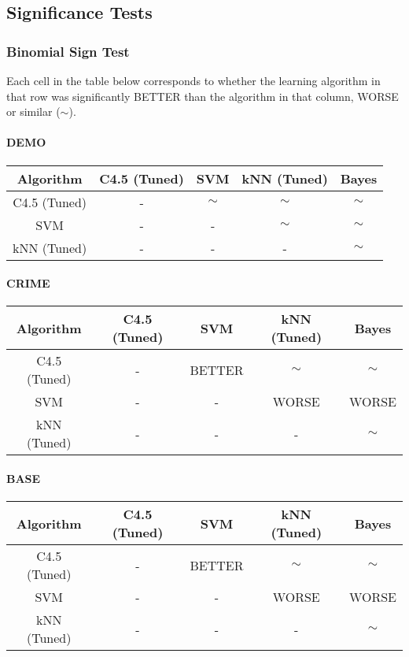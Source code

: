 \documentclass[]{article}
\begin{document}
\subsection{Significance Tests}

\subsubsection{Binomial Sign Test}
Each cell in the table below corresponds to whether the learning algorithm in that row was significantly BETTER than the algorithm in that column, WORSE or similar ($\sim$).

\paragraph{DEMO} \quad

\begin{tabular}{|c|c|c|c|c|}
\hline
Algorithm & C4.5 (Tuned) & SVM & kNN (Tuned) & Bayes \\
\hline
C4.5 (Tuned) & - & $\sim$ & $\sim$ & $\sim$ \\
SVM & - & - & $\sim$ & $\sim$ \\
kNN (Tuned) & - & - & - & $\sim$ \\
\hline
\end{tabular}

\paragraph{CRIME} \quad

\begin{tabular}{|c|c|c|c|c|}
\hline
Algorithm & C4.5 (Tuned) & SVM & kNN (Tuned) & Bayes \\
\hline
C4.5 (Tuned) & - & BETTER & $\sim$ & $\sim$ \\
SVM & - & - & WORSE & WORSE \\
kNN (Tuned) & - & - & - & $\sim$ \\
\hline
\end{tabular}

\paragraph{BASE} \quad

\begin{tabular}{|c|c|c|c|c|}
\hline
Algorithm & C4.5 (Tuned) & SVM & kNN (Tuned) & Bayes \\
\hline
C4.5 (Tuned) & - & BETTER & $\sim$ & $\sim$ \\
SVM & - & - & WORSE & WORSE \\
kNN (Tuned) & - & - & - & $\sim$ \\
\hline
\end{tabular}
\end{document}
